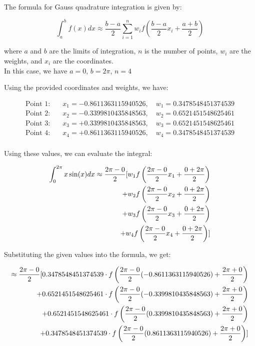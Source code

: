 \documentclass[12pt, a4paper]{article}
\numberwithin{equation}{section}
\begin{document}
The formula for Gauss quadrature integration is given by:

\begin{equation}
    \int_{a}^{b} f(x) dx \approx \frac{b-a}{2} \sum_{i=1}^{n} w_i f\left(\frac{b-a}{2} x_i + \frac{a+b}{2}\right)
\end{equation}



where \(a\) and \(b\) are the limits of integration, \(n\) is the number of points, \(w_i\) are the weights, and \(x_i\) are the coordinates.\\

In this case, we have \(a = 0\), \(b = 2\pi\), \(n = 4\)

Using the provided coordinates and weights, we have:

\begin{align*}
\text{Point 1:} \quad & x_1 = -0.8611363115940526, \quad w_1 = 0.3478548451374539 \\
\text{Point 2:} \quad & x_2 = -0.3399810435848563, \quad w_2 = 0.6521451548625461 \\
\text{Point 3:} \quad & x_3 = +0.3399810435848563, \quad w_3 = 0.6521451548625461 \\
\text{Point 4:} \quad & x_4 = +0.8611363115940526, \quad w_4 = 0.3478548451374539 \\
\end{align*}

Using these values, we can evaluate the integral:

\begin{align}
\int_{0}^{2\pi} x \sin(x) dx \approx \frac{2\pi-0}{2} [w_1 f\left(\frac{2\pi-0}{2} x_1 + \frac{0+2\pi}{2}\right) \notag \\
\quad + w_2 f\left(\frac{2\pi-0}{2} x_2 + \frac{0+2\pi}{2}\right) \notag \\
\quad + w_3 f\left(\frac{2\pi-0}{2} x_3 + \frac{0+2\pi}{2}\right)  \\
\quad + w_4 f\left(\frac{2\pi-0}{2} x_4 + \frac{0+2\pi}{2}\right)] \notag
\end{align}

Substituting the given values into the formula, we get:

\begin{align}
\approx \frac{2\pi - 0}{2} [0.3478548451374539 \cdot f\left(\frac{2\pi - 0}{2}(-0.8611363115940526) + \frac{2\pi + 0}{2}\right) \notag \\
\quad + 0.6521451548625461 \cdot f\left(\frac{2\pi - 0}{2}(-0.3399810435848563) + \frac{2\pi + 0}{2}\right) \\
\quad + 0.6521451548625461 \cdot f\left(\frac{2\pi - 0}{2}(0.3399810435848563) + \frac{2\pi + 0}{2}\right) \notag \\
\quad + 0.3478548451374539 \cdot f\left(\frac{2\pi - 0}{2}(0.8611363115940526) + \frac{2\pi + 0}{2}\right)] \notag
\end{align}
\end{document}
